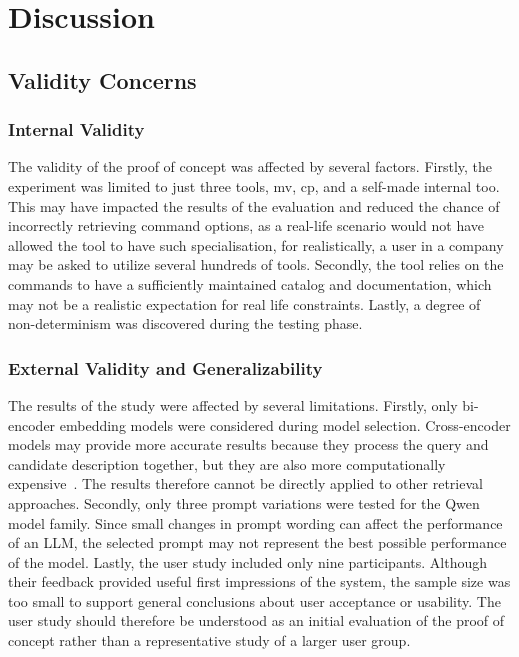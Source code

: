 \section{Discussion}

\subsection{Validity Concerns}

\subsubsection{Internal Validity}

The validity of the proof of concept was affected by several factors. Firstly, the experiment was limited to just three tools, mv, cp, and a self-made internal too. This may have impacted the results of the evaluation and reduced the chance of incorrectly retrieving command options, as a real-life scenario would not have allowed the tool to have such specialisation, for realistically, a user in a company may be asked to utilize several hundreds of tools. Secondly, the tool relies on the commands to have a sufficiently maintained catalog and documentation, which may not be a realistic expectation for real life constraints. Lastly, a degree of non-determinism was discovered during the testing phase. 

\subsubsection{External Validity and Generalizability}

The results of the study were affected by several limitations. Firstly, only bi-encoder embedding models were considered during model selection. Cross-encoder models may provide more accurate results because they process the query and candidate description together, but they are also more computationally expensive~\cite{qin2026ricci}. The results therefore cannot be directly applied to other retrieval approaches. Secondly, only three prompt variations were tested for the Qwen model family. Since small changes in prompt wording can affect the performance of an \ac{LLM}, the selected prompt may not represent the best possible performance of the model. Lastly, the user study included only nine participants. Although their feedback provided useful first impressions of the system, the sample size was too small to support general conclusions about user acceptance or usability. The user study should therefore be understood as an initial evaluation of the proof of concept rather than a representative study of a larger user group.

